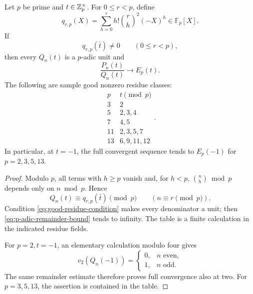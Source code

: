 \begin{theorem}
\label{thm:p-adic-unit-criterion}
Let \(p\) be prime and \(t\in\mathbb Z_p^\times\).  For
\(0\le r<p\), define
\begin{equation}\label{eq:q-rp}
 q_{r,p}(X)=\sum_{h=0}^rh!\binom rh^2(-X)^h\in\mathbb F_p[X].
\end{equation}
If
\begin{equation}\label{eq:good-residue-condition}
 q_{r,p}(\bar t)\ne0\qquad(0\le r<p),
\end{equation}
then every \(Q_n(t)\) is a \(p\)-adic unit and
\begin{equation}\label{eq:full-p-adic-convergence}
 \boxed{\displaystyle
 \frac{P_n(t)}{Q_n(t)}\longrightarrow E_p(t).}
\end{equation}
The following are sample good nonzero residue classes:
\begin{equation}\label{eq:good-residue-table}
 \begin{array}{c|c}
 p&t\pmod p\\ \hline
 3&2\\
 5&2,3,4\\
 7&4,5\\
 11&2,3,5,7\\
 13&6,9,11,12
 \end{array}.
\end{equation}
In particular, at \(t=-1\), the full convergent sequence tends to
\(E_p(-1)\) for \(p=2,3,5,13\).
\end{theorem}

\begin{proof}
Modulo \(p\), all terms with \(h\ge p\) vanish and, for \(h<p\),
\(\binom nh\bmod p\) depends only on \(n\bmod p\).  Hence
\begin{equation}\label{eq:Q-period-p}
 Q_n(t)\equiv q_{r,p}(\bar t)\pmod p
 \qquad(n\equiv r\pmod p).
\end{equation}
Condition \eqref{eq:good-residue-condition} makes every denominator a unit;
then \eqref{eq:p-adic-remainder-bound} tends to infinity.  The table is a
finite calculation in the indicated residue fields.

For \(p=2,t=-1\), an elementary calculation modulo four gives
\begin{equation}\label{eq:Q-v2}
 v_2(Q_n(-1))=
 \begin{cases}0,&n\text{ even},\\1,&n\text{ odd}.
 \end{cases}
\end{equation}
The same remainder estimate therefore proves full convergence also at two.
For \(p=3,5,13\), the assertion is contained in the table.
\end{proof}


